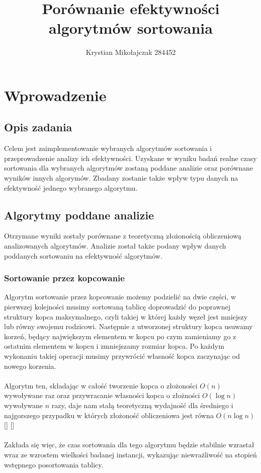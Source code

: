 \documentclass{article}
\title{Porównanie efektywności algorytmów sortowania}
\author{Krystian Mikołajczak 284452}
\begin{document}
    \maketitle
  \section{Wprowadzenie}
      \subsection{Opis zadania}
        Celem jest zaimplementowanie wybranych algorytmów sortowania i przeprowadzenie analizy ich efektywności.
        Uzyskane w wyniku badań realne czasy sortowania dla wybranych algorytmów zostaną poddane analizie oraz porównane wyników innych algorymów.
        Zbadany zostanie także wpływ typu danych na efektywność jednego wybranego algorytmu.
    \subsection{Algorytmy poddane analizie}
      Otrzymane wyniki zostały porównane z teoretyczną złożonością obliczeniową analizowanych algorytmów. Analizie został także podany wpływ danych poddanych sortowaniu na efektywność algorytmów.
      \subsubsection{Sortowanie przez kopcowanie} 
        Algorytm sortowanie przez kopcowanie możemy podzielić na dwie części, w pierwszej kolejności musimy sortowaną tablicę doprowadzić do poprawnej struktury kopca maksymalnego,
        czyli takiej w której każdy węzeł jest mniejszy lub równy swojemu rodzicowi.
        Następnie z utworzonej struktury kopca usuwamy korzeń, będący największym elementem w kopcu po czym zamieniamy go z ostatnim elementem w kopcu i zmniejszamy rozmiar kopca. Po każdym wykonaniu takiej operacji musimy przywrócić własność kopca zaczynając od nowego korzenia. 
        \\\\Algorytm ten, składając w całość tworzenie kopca o złożoności $O(n)$ 
        wywoływane raz oraz przywracanie własności kopca o złożności
        $O(\log n)$ wywoływane $n$ razy, daje nam stałą teoretyczną
        wydajność dla średniego i najgorszego przypadku w których złożoność
        obliczeniowa jest równa $O(n \log n)$ [\cite{AverageHeapSort}] [\cite{WorstHeapSort}] 
        \\\\Zakłada się więc, że czas sortowania dla tego algorytmu będzie stabilnie wzrastał wraz ze wzrostem wielkości badanej instancji, wykazując niewrażliwość na stopień wstępnego posortowania tablicy.
\end{document}
